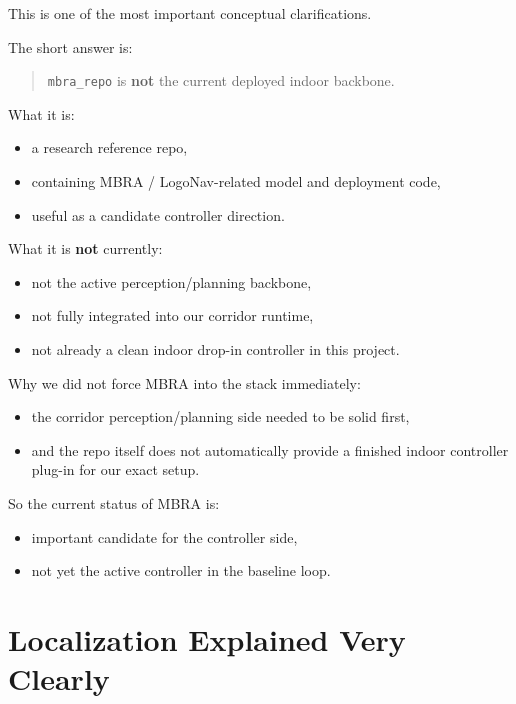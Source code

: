 \documentclass[11pt,a4paper]{article}
\begin{document}
This is one of the most important conceptual clarifications.

The short answer is:

\begin{quote}
\texttt{mbra\_repo} is \textbf{not} the current deployed indoor backbone.
\end{quote}

What it is:

\begin{itemize}[nosep]
  \item a research reference repo,
  \item containing MBRA / LogoNav-related model and deployment code,
  \item useful as a candidate controller direction.
\end{itemize}

What it is \textbf{not} currently:

\begin{itemize}[nosep]
  \item not the active perception/planning backbone,
  \item not fully integrated into our corridor runtime,
  \item not already a clean indoor drop-in controller in this project.
\end{itemize}

Why we did not force MBRA into the stack immediately:

\begin{itemize}[nosep]
  \item the corridor perception/planning side needed to be solid first,
  \item and the repo itself does not automatically provide a finished indoor
        controller plug-in for our exact setup.
\end{itemize}

So the current status of MBRA is:

\begin{itemize}[nosep]
  \item important candidate for the controller side,
  \item not yet the active controller in the baseline loop.
\end{itemize}


\section{Localization Explained Very Clearly}
\end{document}
